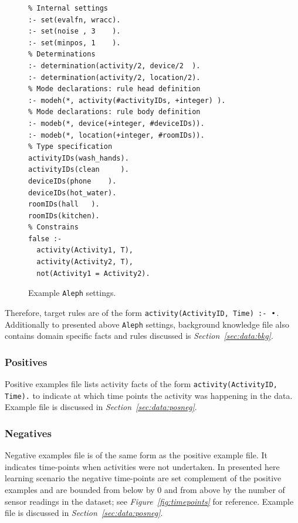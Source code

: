 \documentclass[10pt, a4paper, pdflatex, leqno, twoside, openright]{report}
\DeclareMathOperator*{\Bigcdot}{\scalerel*{\cdot}{\bigodot}}
\begin{document}
\begin{figure}[htb] %
  \begin{verbatim}
% Internal settings
:- set(evalfn, wracc).
:- set(noise , 3    ).
:- set(minpos, 1    ).
% Determinations
:- determination(activity/2, device/2  ).
:- determination(activity/2, location/2).
% Mode declarations: rule head definition
:- modeh(*, activity(#activityIDs, +integer) ).
% Mode declarations: rule body definition
:- modeb(*, device(+integer, #deviceIDs)).
:- modeb(*, location(+integer, #roomIDs)).
% Type specification
activityIDs(wash_hands).
activityIDs(clean     ).
deviceIDs(phone    ).
deviceIDs(hot_water).
roomIDs(hall   ).
roomIDs(kitchen).
% Constrains
false :-
  activity(Activity1, T),
  activity(Activity2, T),
  not(Activity1 = Activity2).
  \end{verbatim}
  \caption{Example \texttt{Aleph} settings.\label{lst:alephSettings}}
\end{figure}

Therefore, target rules are of the form \texttt{activity(ActivityID, Time) :- $\Bigcdot$}.\\

Additionally to presented above \texttt{Aleph} settings, background knowledge file also contains domain specific facts and rules discussed is \emph{Section~\ref{sec:data:bkg}}.

      \subsubsection{Positives}
Positive examples file lists activity facts of the form \texttt{activity(ActivityID, Time).} to indicate at which time points the activity was happening in the data. Example file is discussed in \emph{Section~\ref{sec:data:posneg}}.

      \subsubsection{Negatives}
Negative examples file is of the same form as the positive example file. It indicates time-points when activities were not undertaken. In presented here learning scenario the negative time-points are set complement of the positive examples and are bounded from below by $0$ and from above by the number of sensor readings in the dataset; see \emph{Figure~\ref{fig:timepoints}} for reference. Example file is discussed in \emph{Section~\ref{sec:data:posneg}}.
\end{document}
